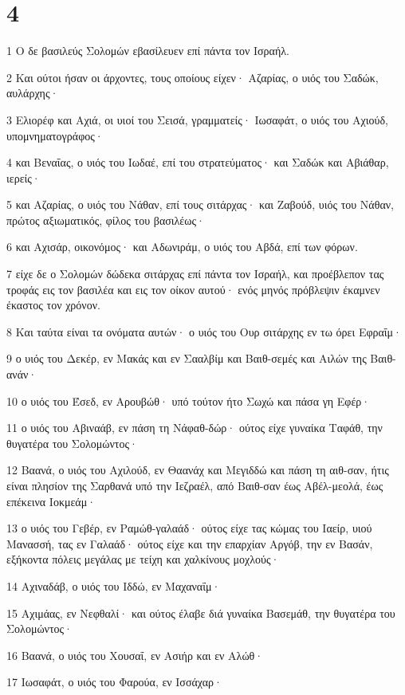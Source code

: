 \chapter{4}

\par 1 Ο δε βασιλεύς Σολομών εβασίλευεν επί πάντα τον Ισραήλ.
\par 2 Και ούτοι ήσαν οι άρχοντες, τους οποίους είχεν· Αζαρίας, ο υιός του Σαδώκ, αυλάρχης·
\par 3 Ελιορέφ και Αχιά, οι υιοί του Σεισά, γραμματείς· Ιωσαφάτ, ο υιός του Αχιούδ, υπομνηματογράφος·
\par 4 και Βεναΐας, ο υιός του Ιωδαέ, επί του στρατεύματος· και Σαδώκ και Αβιάθαρ, ιερείς·
\par 5 και Αζαρίας, ο υιός του Νάθαν, επί τους σιτάρχας· και Ζαβούδ, υιός του Νάθαν, πρώτος αξιωματικός, φίλος του βασιλέως·
\par 6 και Αχισάρ, οικονόμος· και Αδωνιράμ, ο υιός του Αβδά, επί των φόρων.
\par 7 είχε δε ο Σολομών δώδεκα σιτάρχας επί πάντα τον Ισραήλ, και προέβλεπον τας τροφάς εις τον βασιλέα και εις τον οίκον αυτού· ενός μηνός πρόβλεψιν έκαμνεν έκαστος τον χρόνον.
\par 8 Και ταύτα είναι τα ονόματα αυτών· ο υιός του Ουρ σιτάρχης εν τω όρει Εφραΐμ·
\par 9 ο υιός του Δεκέρ, εν Μακάς και εν Σααλβίμ και Βαιθ-σεμές και Αιλών της Βαιθ-ανάν·
\par 10 ο υιός του Έσεδ, εν Αρουβώθ· υπό τούτον ήτο Σωχώ και πάσα γη Εφέρ·
\par 11 ο υιός του Αβιναάβ, εν πάση τη Νάφαθ-δώρ· ούτος είχε γυναίκα Ταφάθ, την θυγατέρα του Σολομώντος·
\par 12 Βαανά, ο υιός του Αχιλούδ, εν Θαανάχ και Μεγιδδώ και πάση τη αιθ-σαν, ήτις είναι πλησίον της Σαρθανά υπό την Ιεζραέλ, από Βαιθ-σαν έως Αβέλ-μεολά, έως επέκεινα Ιοκμεάμ·
\par 13 ο υιός του Γεβέρ, εν Ραμώθ-γαλαάδ· ούτος είχε τας κώμας του Ιαείρ, υιού Μανασσή, τας εν Γαλαάδ· ούτος είχε και την επαρχίαν Αργόβ, την εν Βασάν, εξήκοντα πόλεις μεγάλας με τείχη και χαλκίνους μοχλούς·
\par 14 Αχιναδάβ, ο υιός του Ιδδώ, εν Μαχαναΐμ·
\par 15 Αχιμάας, εν Νεφθαλί· και ούτος έλαβε διά γυναίκα Βασεμάθ, την θυγατέρα του Σολομώντος·
\par 16 Βαανά, ο υιός του Χουσαΐ, εν Ασιήρ και εν Αλώθ·
\par 17 Ιωσαφάτ, ο υιός του Φαρούα, εν Ισσάχαρ·
